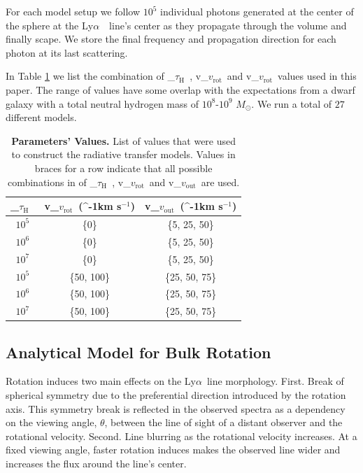 \documentclass[a4paper,fleqn,usenatbib]{mnras}
\newcommand{\lya}{\ifmmode{{\rm Ly}\alpha}\else Ly$\alpha$\ \fi}
\newcommand{\kms}{\ifmmode\mathrm{km\ s}^{-1}\else km s$^{-1}$\fi}
\newcommand{\vrot}{\ifmmode\mathrm v_{\mathrm{rot}}\else $v_{\mathrm{rot}}$~\fi}
\newcommand{\vout}{\ifmmode\mathrm v_{\mathrm{out}}\else $v_{\mathrm{out}}$~\fi}
\newcommand{\tauh}{\ifmmode\mathrm \tau_{\mathrm{H}}\else $\tau_{\mathrm{H}}$~\fi}
\begin{document}
For each model setup we follow $10^5$ individual photons generated at
the center of the sphere at the \lya\ line's center as they propagate
through the volume and finally scape.
We store the final frequency and propagation direction for each photon
at its last scattering.

In Table \ref{tab:values} we list the combination of \tauh,
\vrot and \vrot values used in this paper.
The range of values have some overlap with the expectations from a dwarf
galaxy with a total neutral hydrogen mass of $10^8$-$10^9$ $M_{\odot}$.
We run a total of $27$ different models.

\begin{table}
  \begin{center}
    \begin{tabular}{|c|c|c|}
      \hline
      \tauh & \vrot (\kms) & \vout (\kms) \\
      \hline
      $10^5$ & \{0\} & \{5, 25, 50\} \\
      $10^6$ & \{0\} & \{5, 25, 50\}\\
      $10^7$ & \{0\} & \{5, 25, 50\}\\
      $10^5$ & \{50, 100\} & \{25, 50, 75\} \\
      $10^6$ & \{50, 100\} & \{25, 50, 75\}\\
      $10^7$ & \{50, 100\} & \{25, 50, 75\}\\
      \hline
    \end{tabular}
  \end{center}
  \caption{\textbf{Parameters' Values.} List of values that were used
    to construct the radiative transfer models. Values in braces
    for a row indicate that all possible combinations in of
    \tauh, \vrot and \vout are used.}
  \label{tab:values}
\end{table}


\subsection{Analytical Model for Bulk Rotation}

Rotation induces two main effects on the \lya line morphology.
First. Break of spherical symmetry due to the
preferential direction introduced by the rotation axis.
This symmetry break is reflected in the observed spectra as a
dependency on the viewing angle, $\theta$, between the line of sight
of a distant observer and the rotational velocity.
Second. Line blurring as the rotational velocity increases.
At a fixed viewing angle, faster rotation induces makes the observed
line wider and increases the flux around the line's center.
\end{document}
